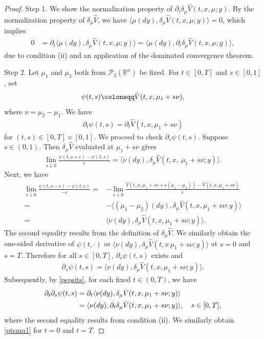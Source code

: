 \documentclass{amsart}
\theoremstyle{definition}
\theoremstyle{remark}
\numberwithin{equation}{section}
\begin{document}
\begin{proof}


Step 1. We show the normalization property
of $ \partial_t \delta_\mu \hat V(t, x, \mu; y)$.
By the normalization property of $\delta_\mu \hat V$, we have
$\langle \mu(dy), \delta_\mu \hat V(t, x, \mu; y)\rangle=0$,   %
which implies
\begin{align*}
0&=\partial_t \langle \mu(dy), \delta_\mu \hat V(t, x, \mu; y)\rangle= \langle \mu(dy),\partial_t \delta_\mu \hat V(t, x, \mu; y)\rangle,
\end{align*}
due to condition (ii) and an application of the dominated convergence theorem.

Step 2.
Let $\mu_1$ and $\mu_2$ both from ${\mathcal P}_2(\mathbb{R}^n)$ be fixed.
For $t\in [0,T]$ and $s\in [0,1]$, set
\begin{align}
\psi(t,s) \coloneqq  \hat V(t, x, \mu_1+s\nu), \notag %
\end{align}
where $\nu= \mu_2-\mu_1$. We have
\begin{align}
\partial_t \psi(t,s)= \partial_t \hat V(t,x,\mu_1+s\nu) \label{ptstV}
\end{align}
for $(t,s)\in [0,T]\times [0,1]$.
We proceed to check $\partial_s \psi(t,s)$.
Suppose $s\in (0, 1)$. Then $\delta_\mu \hat V$ evaluated  at $\mu_1+s\nu$ gives
\begin{align*}
\lim_{\epsilon \downarrow 0}\frac{\psi(t, s+\epsilon)-\psi(t, s) }{\epsilon }=\langle \nu(dy), \delta_\mu \hat V(t,x, \ \mu_1+s\nu; y)\rangle.
\end{align*}
Next, we have
\begin{align*}
\lim_{\epsilon \downarrow 0}\frac{\psi(t, s-\epsilon)-\psi(t, s) }
{-\epsilon }= &-\lim_{\epsilon \downarrow 0} \frac{\hat V(t, x, \mu_1+s\nu+\epsilon (\mu_1-\mu_2))- \hat V(t, x, \mu_1+s\nu)   }{\epsilon }   \\
=&-\langle (\mu_1-\mu_2)(dy), \delta_\mu \hat V(t,x , \mu_1+s\nu; y)\rangle \\
=& \langle \nu(dy), \delta_\mu \hat V(t,x ,\mu_1+s\nu; y)\rangle.
\end{align*}
The second equality results from the definition of $\delta_\mu \hat V  $.
We  similarly obtain the one-sided derivative of $\psi(t,\cdot) $ as $\langle \nu(dy), \delta_\mu \hat V(t,x \, \mu_1+s\nu; y)\rangle$ at $s=0$ and $s=T$. Therefore for all $s\in [0,T]$,   $\partial_s \psi(t,s)$ exists   and
\begin{align}
\partial_s \psi(t,s)= \langle \nu(dy), \delta_\mu \hat V(t,x , \mu_1+s\nu; y)\rangle. \label{pspsits}
\end{align}
Subsequently, by \eqref{pspsits}, for each fixed $t\in (0,T)$, we have
\begin{align}
\partial_t\partial_s \psi(t,s)&=\partial_t \langle \nu(dy), \delta_\mu \hat V(t,x , \mu_1+s\nu; y)\rangle \notag  \\
&= \langle \nu(dy),\partial_t \delta_\mu \hat V(t,x ,
\mu_1+s\nu; y)\rangle, \quad s\in [0,T], \label{ptsmu1}
\end{align}
where the second equality results from   condition (ii). We similarly obtain \eqref{ptsmu1} for  $t=0$ and $t=T$.



\end{proof}
\end{document}
